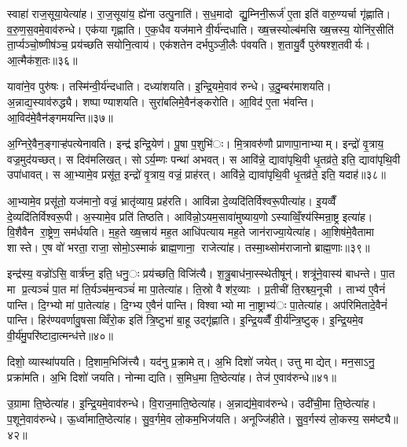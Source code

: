 स्वाहा॑ राज॒सूया॒येत्या॑ह। रा॒ज॒सूया॑य॒ ह्ये॑ना उत्पु॒नाति॑। स॒ध॒मादो द्यु॒म्निनी॒रूर्ज॑ ए॒ता इति॑ वारु॒ण्यर्चा गृ॑ह्णाति। व॒रु॒ण॒स॒वमे॒वाव॑रुन्धे। एक॑या गृह्णाति। ए॒क॒धैव यज॑माने वी॒र्य॑न्दधाति। ख्ष॒त्त्रस्योल्ब॑मसि ख्ष॒त्त्रस्य॒ योनि॑र॒सीति॑ ता॒र्प्यञ्चो॒ष्णीष॑ञ्च॒ प्रय॑च्छति सयोनि॒त्वाय॑। एक॑शतेन दर्भपुञ्जी॒लैः प॑वयति। श॒तायु॒र्वै पुरु॑षश्श॒तवीर्यः। आ॒त्मैक॑श॒तः॥३६॥

यावा॑ने॒व पुरु॑षः। तस्मि॑न्वी॒र्य॑न्दधाति। दध्या॑शयति। इ॒न्द्रि॒यमे॒वाव॑ रुन्धे। उ॒दु॒म्बर॑माशयति। अ॒न्नाद्य॒स्याव॑रुद्ध्यै। शष्पाण्याशयति। सुरा॑बलिमे॒वैन॑ङ्करोति। आ॒विद॑ ए॒ता भ॑वन्ति। आ॒विद॑मे॒वैन॑ङ्गमयन्ति॥३७॥

अ॒ग्निरे॒वैन॒ङ्गाऱ्ह॑पत्येनावति। इन्द्र॑ इन्द्रि॒येण॑। पू॒षा प॒शुभि॑ः। मि॒त्रावरु॑णौ प्राणापा॒नाभ्याम्। इन्द्रो॑ वृ॒त्राय॒ वज्र॒मुद॑यच्छत्। स दिव॑मलिखत्। सोऽर्य॒म्णः पन्था॑ अभवत्। स आवि॑न्ने॒ द्यावा॑पृथि॒वी धृ॒तव्र॑ते॒ इति॒ द्यावा॑पृथि॒वी उपा॑धावत्। स आ॒भ्यामे॒व प्रसू॑त॒ इन्द्रो॑ वृ॒त्राय॒ वज्रं॒ प्राह॑रत्। आवि॑न्ने॒ द्यावा॑पृथि॒वी धृ॒तव्र॑ते॒ इति॒ यदाह॑॥३८॥

आ॒भ्यामे॒व प्रसू॑तो॒ यज॑मानो॒ वज्रं॒ भ्रातृ॑व्याय॒ प्रह॑रति। आवि॑न्ना दे॒व्यदि॑तिर्विश्वरू॒पीत्या॑ह। इ॒यव्वैँ दे॒व्यदि॑तिर्विश्वरू॒पी। अ॒स्यामे॒व प्रति॑ तिष्ठति। आवि॑न्नो॒ऽयम॒सावा॑मुष्याय॒णोऽस्याव्विँ॒श्य॑स्मिन्रा॒ष्ट्र इत्या॑ह। वि॒शैवैन रा॒ष्ट्रेण॒ सम॑र्धयति। म॒ह॒ते ख्ष॒त्त्राय॑ मह॒त आधि॑पत्याय मह॒ते जान॑राज्या॒येत्या॑ह। आ॒शिष॑मे॒वैतामा शास्ते। ए॒ष वो॑ भरता॒ राजा॒ सोमो॒ऽस्माकं॑ ब्राह्म॒णाना॒ राजेत्या॑ह। तस्मा॒थ्सोम॑राजानो ब्राह्म॒णाः॥३९॥

इन्द्र॑स्य॒ वज्रो॑ऽसि॒ वार्त्र॑घ्न॒ इति॒ धनु॒ः प्रय॑च्छति॒ विजि॑त्यै। श॒त्रु॒बाध॑ना॒स्स्थेतीषून्॑। शत्रू॑ने॒वास्य॑ बाधन्ते। पा॒त मा प्र॒त्यञ्चं॑ पा॒त मा॑ ति॒र्यञ्च॑म॒न्वञ्चं॑ मा पा॒तेत्या॑ह। ति॒स्रो वै श॑र॒व्याः। प्र॒तीची॑ ति॒रश्च्य॒नूची। ताभ्य॑ ए॒वैनं॑ पान्ति। दि॒ग्भ्यो मा॑ पा॒तेत्या॑ह। दि॒ग्भ्य ए॒वैनं॑ पान्ति। विश्वाभ्यो मा ना॒ष्ट्राभ्य॑ः पा॒तेत्या॑ह। अप॑रिमितादे॒वैनं॑ पान्ति। हिर॑ण्यवर्णावु॒षसाव्विँरो॒क इति॑ त्रि॒ष्टुभा॑ बा॒हू उद्गृ॑ह्णाति। इ॒न्द्रि॒यव्वैँ वी॒र्य॑न्त्रि॒ष्टुक्। इ॒न्द्रि॒यमे॒व वी॒र्य॑मु॒परि॑ष्टादा॒त्मन्ध॑त्ते॥४०॥


दिशो॒ व्यास्था॑पयति। दि॒शाम॒भिजि॑त्त्यै। यद॑नु प्र॒क्रामेत्। अ॒भि दिशो॑ जयेत्। उत्तु माद्येत्। मन॒साऽनु॒ प्रक्रा॑मति। अ॒भि दिशो॑ जयति। नोन्माद्यति। स॒मिध॒मा ति॒ष्ठेत्या॑ह। तेज॑ ए॒वाव॑रुन्धे॥४१॥

उ॒ग्रामा ति॒ष्ठेत्या॑ह। इ॒न्द्रि॒यमे॒वाव॑रुन्धे। वि॒राज॒माति॒ष्ठेत्या॑ह। अ॒न्नाद्य॑मे॒वाव॑रुन्धे। उदी॑ची॒मा ति॒ष्ठेत्या॑ह। प॒शूने॒वाव॑रुन्धे। ऊ॒र्ध्वामाति॒ष्ठेत्या॑ह। सु॒व॒र्गमे॒व लो॒कम॒भिज॑यति। अनूज्जि॑हीते। सु॒व॒र्गस्य॑ लो॒कस्य॒ सम॑ष्ट्यै॥४२॥

